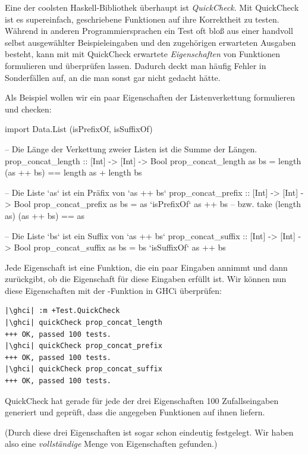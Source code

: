 \documentclass{uebblatt}
\begin{document}
Eine der coolsten Haskell-Bibliothek überhaupt ist \emph{QuickCheck}. Mit
QuickCheck ist es supereinfach, geschriebene Funktionen auf ihre Korrektheit zu
testen. Während in anderen Programmiersprachen ein Test oft bloß aus einer
handvoll selbst ausgewählter Beispieleingaben und den zugehörigen erwarteten
Ausgaben besteht, kann mit mit QuickCheck erwartete \emph{Eigenschaften} von
Funktionen formulieren und überprüfen lassen. Dadurch deckt man häufig Fehler in
Sonderfällen auf, an die man sonst gar nicht gedacht hätte.

Als Beispiel wollen wir ein paar Eigenschaften der Listenverkettung
\haskellinline{(++) :: [a] -> [a] -> [a]} formulieren und checken:

\begin{haskellcode}
import Data.List (isPrefixOf, isSuffixOf)

-- Die Länge der Verkettung zweier Listen ist die Summe der Längen.
prop_concat_length :: [Int] -> [Int] -> Bool
prop_concat_length as bs = length (as ++ bs) == length as + length bs

-- Die Liste `as` ist ein Präfix von `as ++ bs`
prop_concat_prefix :: [Int] -> [Int] -> Bool
prop_concat_prefix as bs = as `isPrefixOf` as ++ bs
-- bzw. take (length as) (as ++ bs) == as

-- Die Liste `bs` ist ein Suffix von `as ++ bs`
prop_concat_suffix :: [Int] -> [Int] -> Bool
prop_concat_suffix as bs = bs `isSuffixOf` as ++ bs
\end{haskellcode}

Jede Eigenschaft ist eine Funktion, die ein paar Eingaben annimmt und dann
zurückgibt, ob die Eigenschaft für diese Eingaben erfüllt ist. Wir können
nun diese Eigenschaften mit der -Funktion in GHCi
überprüfen:

\begin{verbatim}
|\ghci| :m +Test.QuickCheck
|\ghci| quickCheck prop_concat_length
+++ OK, passed 100 tests.
|\ghci| quickCheck prop_concat_prefix
+++ OK, passed 100 tests.
|\ghci| quickCheck prop_concat_suffix
+++ OK, passed 100 tests.
\end{verbatim}

QuickCheck hat gerade für jede der drei Eigenschaften 100 Zufallseingaben
generiert und geprüft, dass die angegeben Funktionen auf ihnen
 liefern.

(Durch diese drei Eigenschaften ist \haskellinline{(++)} sogar schon eindeutig
festgelegt. Wir haben also eine \emph{vollständige} Menge von Eigenschaften
gefunden.)
\end{document}
